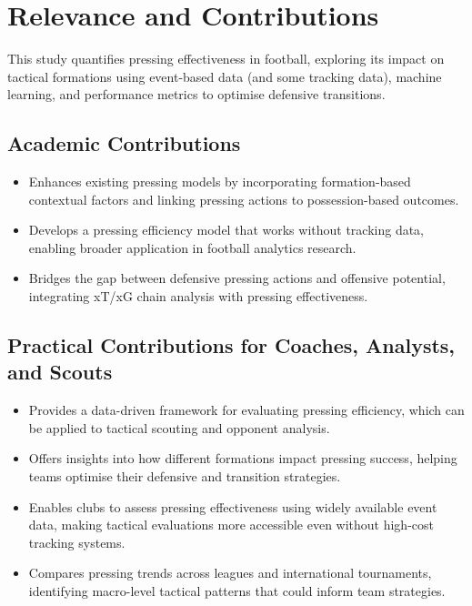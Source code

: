 \section{Relevance and Contributions}

This study quantifies pressing effectiveness in football, exploring its impact on tactical formations using event-based data (and some tracking data), machine learning, and performance metrics to optimise defensive transitions.

\subsection{Academic Contributions}

\begin{itemize}
    \item Enhances existing pressing models by incorporating formation-based contextual factors and linking pressing actions to possession-based outcomes.
    \item Develops a pressing efficiency model that works without tracking data, enabling broader application in football analytics research.
    \item Bridges the gap between defensive pressing actions and offensive potential, integrating xT/xG chain analysis with pressing effectiveness.
\end{itemize}


\subsection{Practical Contributions for Coaches, Analysts, and Scouts}

\begin{itemize}
    \item Provides a data-driven framework for evaluating pressing efficiency, which can be applied to tactical scouting and opponent analysis.
    \item Offers insights into how different formations impact pressing success, helping teams optimise their defensive and transition strategies.
    \item Enables clubs to assess pressing effectiveness using widely available event data, making tactical evaluations more accessible even without high-cost tracking systems.
    \item Compares pressing trends across leagues and international tournaments, identifying macro-level tactical patterns that could inform team strategies.
\end{itemize}

